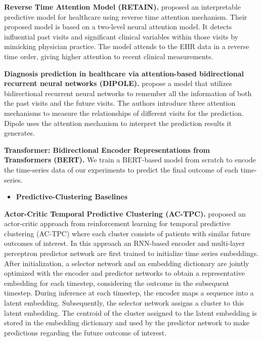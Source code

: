 \documentclass[pmlr,twocolumn,10pt]{jmlr} %
\begin{document}
\vspace{.2em}
\noindent
\textbf{Reverse Time Attention Model (RETAIN).}
\citet{choi2016retain} proposed an interpretable predictive model for healthcare using reverse time attention mechanism. Their proposed model is based on a two-level neural attention model. It detects influential past visits and significant clinical variables within those visits by mimicking physician practice. The model attends to the EHR data in a reverse time order, giving higher attention to recent clinical measurements.

\vspace{.2em}
\noindent
\textbf{Diagnosis prediction in healthcare via attention-based bidirectional recurrent neural networks (DIPOLE).}
\citet{ma2017dipole} propose a model that utilizes bidirectional recurrent neural networks to remember all the information of both the past visits and the future visits. The authors introduce three attention mechanisms to measure the relationships of different visits for the prediction. Dipole uses the attention mechanism to interpret the prediction results it generates.

\vspace{.2em}
\noindent
\textbf{Transformer: Bidirectional Encoder Representations from Transformers (BERT).} 
We train a BERT-based \citep{devlin2018bert} model from scratch to encode the time-series data of our experiments to predict the final outcome of each time-series.


\begin{itemize}
    \item \textbf{Predictive-Clustering Baselines}
    \vspace{-0.5em}
\end{itemize}
\noindent
\textbf{Actor-Critic Temporal Predictive Clustering (AC-TPC).}
\citet{lee2020temporal} proposed an actor-critic approach from reinforcement learning for temporal predictive clustering (AC-TPC) where each cluster consists of patients with similar future outcomes of interest.
In this approach an RNN-based encoder and multi-layer perceptron predictor network are first trained to initialize time series embeddings.
After initialization, a selector network and an embedding dictionary are jointly optimized with the encoder and predictor networks to obtain a representative embedding for each timestep, considering the outcome in the subsequent timestep. During inference at each timestep, the encoder maps a sequence into a latent embedding. Subsequently, the selector network assigns a cluster to this latent embedding. The centroid of the cluster assigned to the latent embedding is stored in the embedding dictionary and used by the predictor network to make predictions regarding the future outcome of interest.
\end{document}
